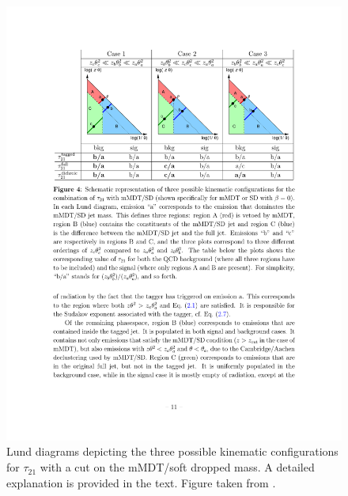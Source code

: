 \documentclass[11pt,letterpaper]{article}
\begin{document}
\begin{figure}[t!]
\begin{center}
\includegraphics[width=0.75\columnwidth]{figures/dichroic_placeholder}
\end{center}
\caption{Lund diagrams depicting the three possible kinematic configurations for $\tau_{21}$ with a cut on the mMDT/soft dropped mass. A detailed explanation is provided in the text. Figure taken from \cite{Salam:2016yht}.}
\label{fig:dichroic}
\end{figure}
\end{document}
